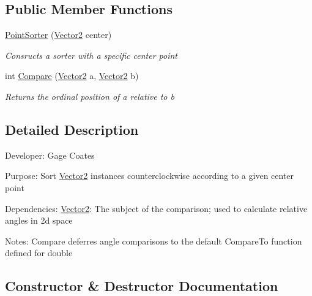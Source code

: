 \subsection*{Public Member Functions}
\begin{DoxyCompactItemize}
\item 
\mbox{\hyperlink{class_eagle_eye_1_1_models_1_1_geometry_1_1_point_sorter_ac598f34ac3edaa7ee2a700c46e08fa63}{Point\+Sorter}} (\mbox{\hyperlink{struct_eagle_eye_1_1_models_1_1_geometry_1_1_vector2}{Vector2}} center)
\begin{DoxyCompactList}\small\item\em Consructs a sorter with a specific center point \end{DoxyCompactList}\item 
int \mbox{\hyperlink{class_eagle_eye_1_1_models_1_1_geometry_1_1_point_sorter_a418d1236f488e527d3f236efef379d3b}{Compare}} (\mbox{\hyperlink{struct_eagle_eye_1_1_models_1_1_geometry_1_1_vector2}{Vector2}} a, \mbox{\hyperlink{struct_eagle_eye_1_1_models_1_1_geometry_1_1_vector2}{Vector2}} b)
\begin{DoxyCompactList}\small\item\em Returns the ordinal position of a relative to b \end{DoxyCompactList}\end{DoxyCompactItemize}


\subsection{Detailed Description}
Developer\+: Gage Coates 

Purpose\+: Sort \mbox{\hyperlink{struct_eagle_eye_1_1_models_1_1_geometry_1_1_vector2}{Vector2}} instances counterclockwise according to a given center point

Dependencies\+: \mbox{\hyperlink{struct_eagle_eye_1_1_models_1_1_geometry_1_1_vector2}{Vector2}}\+: The subject of the comparison; used to calculate relative angles in 2d space

Notes\+: Compare deferres angle comparisons to the default Compare\+To function defined for double 

\subsection{Constructor \& Destructor Documentation}
\mbox{\label{class_eagle_eye_1_1_models_1_1_geometry_1_1_point_sorter_ac598f34ac3edaa7ee2a700c46e08fa63}} 
